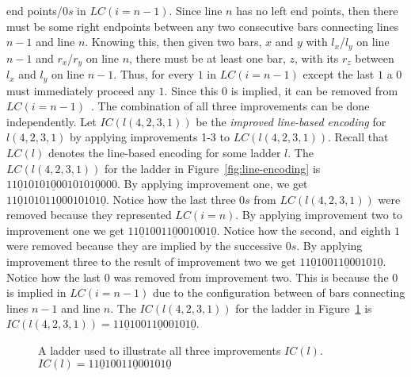 end points/$0s$ in $LC(i=n-1)$. Since line $n$ has no left end points,
then there must be some right endpoints between any two 
consecutive bars connecting lines $n-1$ and line $n$. Knowing this, then 
given two bars, $x$ and $y$ with $l_{x}$/$l_{y}$ on line 
$n-1$ and $r_{x}$/$r_{y}$ on line $n$, there must be at least 
one bar, $z$, with its $r_{z}$ between $l_{x}$ and $l_{y}$
on line $n-1$. Thus, for every $1$ in $LC(i=n-1)$ except the 
last $1$ a $0$ must immediately proceed any $1$. 
Since this $0$ is implied, it can be removed from $LC(i=n-1)$~\cite{A5}. 
The combination of all three improvements can be done independently.\newline 
Let $IC(l(4,2,3,1))$ be the \emph{improved line-based encoding} for $l(4,2,3,1)$ 
by applying improvements 1-3 to $LC(l(4,2,3,1))$. Recall that $LC(l)$ denotes the line-based encoding for some ladder $l$.
The $LC(l(4,2,3,1))$ for the ladder in Figure~\ref{fig:line-encoding} is $11\underline{0}10101\underline{0}0010101\underline{0}000$.
By applying improvement one, we get $11\underline{0}101011\underline{0}0010101\underline{0}$. 
Notice how the last three $0s$ from $LC(l(4,2,3,1))$ were removed because they represented $LC(i=n)$.
By applying improvement two to improvement one we get $11\underline{0}10011\underline{0}001001\underline{0}$.
Notice how the second, and eighth $1$ were removed because they are implied by 
the successive $0s$. By applying improvement three to the result of improvement 
two we get $11\underline{0}10011\underline{0}00101\underline{0}$. Notice how the last $0$ 
was removed from improvement two. This is because the $0$ is implied in $LC(i=n-1)$
due to the configuration between of bars connecting lines $n-1$ and line $n$. The $IC(l(4,2,3,1))$ for the ladder in Figure~\ref{Fig:allthree} 
is $IC(l(4,2,3,1))=11\underline{0}10011\underline{0}00101\underline{0}$.
\begin{figure}[h]
     \centering
     \caption{A ladder used to illustrate all three improvements $IC(l)$. 
     \newline $IC(l)=11\underline{0}10011\underline{0}00101\underline{0}$}
     \label{Fig:allthree}
\end{figure}